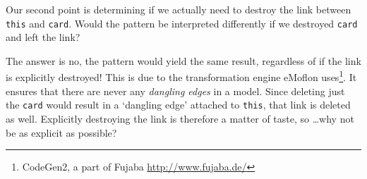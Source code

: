 Our second point is determining if we actually need to destroy the link between \texttt{this} and \texttt{card}. Would the pattern be interpreted differently if we
destroyed \texttt{card} and left the link?

The answer is no, the pattern would yield the same result, regardless of if the link is explicitly destroyed!  This is due to the
transformation engine eMoflon uses\footnote{CodeGen2, a part of Fujaba \url{http://www.fujaba.de/}}. It ensures that there are never any \emph{dangling edges}
in a model. Since deleting just the \texttt{card} would result in a `dangling edge' attached to \texttt{this}, that link is deleted as well. Explicitly
destroying the link is therefore a matter of taste, so \ldots why not be as explicit as possible?





